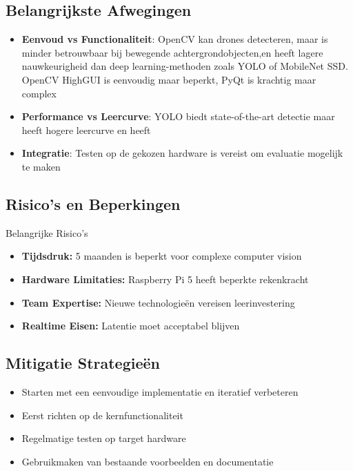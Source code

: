 \documentclass[11pt,a4paper]{scrartcl}
\begin{document}
\subsection{Belangrijkste Afwegingen}
\begin{itemize}[leftmargin=*]
    \item \textbf{Eenvoud vs Functionaliteit}: OpenCV kan drones detecteren, maar is minder betrouwbaar bij bewegende achtergrondobjecten,en heeft lagere nauwkeurigheid dan deep learning-methoden zoals YOLO of MobileNet SSD.
    \newline OpenCV HighGUI is eenvoudig maar beperkt, PyQt is krachtig maar complex
    
    \item \textbf{Performance vs Leercurve}: YOLO biedt state-of-the-art detectie maar heeft hogere leercurve en heeft 
    \item \textbf{Integratie}: Testen op de gekozen hardware is vereist om evaluatie mogelijk te maken
\end{itemize}

\subsection{Risico's en Beperkingen}
\begin{infobox}{Belangrijke Risico's}
\begin{itemize}[leftmargin=*,nosep]
    \item \textbf{Tijdsdruk:} 5 maanden is beperkt voor complexe computer vision
    \item \textbf{Hardware Limitaties:} Raspberry Pi 5 heeft beperkte rekenkracht
    \item \textbf{Team Expertise:} Nieuwe technologieën vereisen leerinvestering
    \item \textbf{Realtime Eisen:} Latentie moet acceptabel blijven
\end{itemize}
\end{infobox}

\subsection{Mitigatie Strategieën}
\begin{itemize}[leftmargin=*]
    \item Starten met een eenvoudige implementatie en iteratief verbeteren
    \item Eerst richten op de kernfunctionaliteit
    \item Regelmatige testen op target hardware
    \item Gebruikmaken van bestaande voorbeelden en documentatie
\end{itemize}
\end{document}
